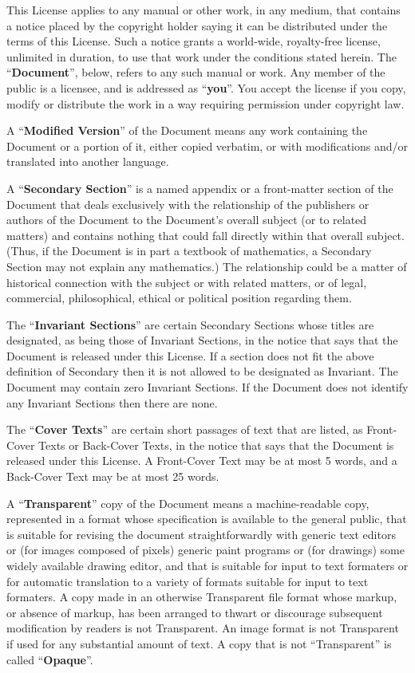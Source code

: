 \documentclass[10pt,a4paper,final]{book}
\begin{document}
{This License applies to any manual or other work, in any medium, that
contains a notice placed by the copyright holder saying it can be
distributed under the terms of this License.  Such a notice grants a
world-wide, royalty-free license, unlimited in duration, to use that
work under the conditions stated herein.  The ``\textbf{Document}'', below,
refers to any such manual or work.  Any member of the public is a
licensee, and is addressed as ``\textbf{you}''.  You accept the license if you
copy, modify or distribute the work in a way requiring permission
under copyright law.

A ``\textbf{Modified Version}'' of the Document means any work containing the
Document or a portion of it, either copied verbatim, or with
modifications and/or translated into another language.

A ``\textbf{Secondary Section}'' is a named appendix or a front-matter section of
the Document that deals exclusively with the relationship of the
publishers or authors of the Document to the Document's overall subject
(or to related matters) and contains nothing that could fall directly
within that overall subject.  (Thus, if the Document is in part a
textbook of mathematics, a Secondary Section may not explain any
mathematics.)  The relationship could be a matter of historical
connection with the subject or with related matters, or of legal,
commercial, philosophical, ethical or political position regarding
them.

The ``\textbf{Invariant Sections}'' are certain Secondary Sections whose titles
are designated, as being those of Invariant Sections, in the notice
that says that the Document is released under this License.  If a
section does not fit the above definition of Secondary then it is not
allowed to be designated as Invariant.  The Document may contain zero
Invariant Sections.  If the Document does not identify any Invariant
Sections then there are none.

The ``\textbf{Cover Texts}'' are certain short passages of text that are listed,
as Front-Cover Texts or Back-Cover Texts, in the notice that says that
the Document is released under this License.  A Front-Cover Text may
be at most 5 words, and a Back-Cover Text may be at most 25 words.

A ``\textbf{Transparent}'' copy of the Document means a machine-read\-able copy,
represented in a format whose specification is available to the
general public, that is suitable for revising the document
straightforwardly with generic text editors or (for images composed of
pixels) generic paint programs or (for drawings) some widely available
drawing editor, and that is suitable for input to text formaters or
for automatic translation to a variety of formats suitable for input
to text formaters.  A copy made in an otherwise Transparent file
format whose markup, or absence of markup, has been arranged to thwart
or discourage subsequent modification by readers is not Transparent.
An image format is not Transparent if used for any substantial amount
of text.  A copy that is not ``Transparent'' is called ``\textbf{Opaque}''.

}
\end{document}
